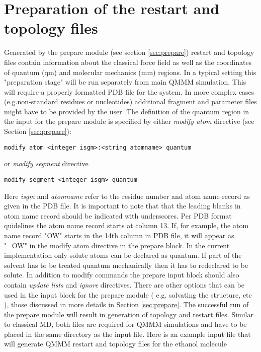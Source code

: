 \section{Preparation of the restart and topology files}

Generated by the prepare
module (see section \ref{sec:prepare}) restart and topology files contain
information about the classical force field as well as the
coordinates of quantum (qm) and molecular
mechanics (mm) regions. 
In a typical setting this "preparation stage" 
will be run separately from main QMMM simulation. This will require a 
properly formatted
PDB file for the system. In more complex cases (e.g.non-standard residues or nucleotides) additional fragment and parameter
files might have to be provided by the user. The definition of the quantum region
in the input for the prepare module is specified by either {\it modify atom} directive (see Section \ref{sec:prepare}):

\begin{verbatim}
modify atom <integer isgm>:<string atomname> quantum
\end{verbatim}

or {\it modify segment} directive

\begin{verbatim}
modify segment <integer isgm> quantum
\end{verbatim}

Here {\it isgm} and {\it atomname} refer to the residue number and atom name record 
as given in the PDB file.
It is important to note that  
that the leading blanks 
in atom name record should be indicated with underscores.
Per PDB format quidelines the atom name record starts at column 13. If, for example, 
the atom name record "OW" starts 
in the 14th column in PDB file, it will appear 
as "\_OW" in the modify atom directive in the prepare block. In the current implementation
only solute atoms can be declared as quantum. If part of the solvent has to be treated quantum mechanically
then it has to redeclared to be solute.
In addition to modify commands the prepare input block should 
also contain {\it update lists} and {\it ignore} directives. There are other options
that can be used in the input block for the prepare module ( e.g. solvating the structure, etc ),
 those discussed 
in more details in Section \ref{sec:prepare}.
The successful run of the prepare module will result in generation of
topology and restart files. Similar to classical MD, both files are required for QMMM simulations 
and have to be placed in the same directory
as the input file. Here is an example input file that will generate QMMM restart and topology files for the ethanol molecule

